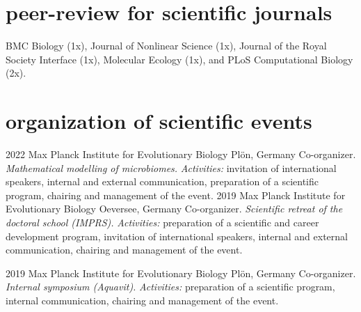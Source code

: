 \documentclass[]{friggeri-cv} %
\begin{document}
\section{peer-review for scientific journals}
BMC Biology (1x),  Journal of Nonlinear Science (1x), Journal of the Royal Society Interface (1x), Molecular Ecology (1x), and PLoS Computational Biology (2x).

\section{organization of scientific events}

\begin{entrylist}
\entry
{2022}
{}
{Max Planck Institute for Evolutionary Biology}
{Plön, Germany}
{Co-organizer. \emph{Mathematical modelling of microbiomes.}}
{\emph{Activities:} invitation of international speakers, internal and external communication, preparation of a scientific program, chairing and management of the event.}
\entry
{2019}
{}
{Max Planck Institute for Evolutionary Biology}
{Oeversee, Germany}
{Co-organizer. \emph{Scientific retreat of the doctoral school (IMPRS).}}
{\emph{Activities:} preparation of a scientific and career development program, invitation of international speakers, internal and external communication, chairing and management of the event.}
\end{entrylist}
\begin{entrylist}
\entry
{2019}
{}
{Max Planck Institute for Evolutionary Biology}
{Plön, Germany}
{Co-organizer. \emph{Internal symposium (Aquavit).}}
{\emph{Activities:} preparation of a scientific program, internal communication, chairing and management of the event.}
\end{entrylist}

\end{document}
